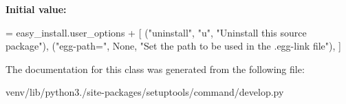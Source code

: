 {\bfseries Initial value\+:}
\begin{DoxyCode}
=  easy\_install.user\_options + [
        (\textcolor{stringliteral}{"uninstall"}, \textcolor{stringliteral}{"u", "}Uninstall this source package"),
        (\textcolor{stringliteral}{"egg-path="}, \textcolor{keywordtype}{None}, \textcolor{stringliteral}{"Set the path to be used in the .egg-link file"}),
    ]
\end{DoxyCode}


The documentation for this class was generated from the following file\+:\begin{DoxyCompactItemize}
\item 
venv/lib/python3./site-\/packages/setuptools/command/develop.\+py\end{DoxyCompactItemize}
